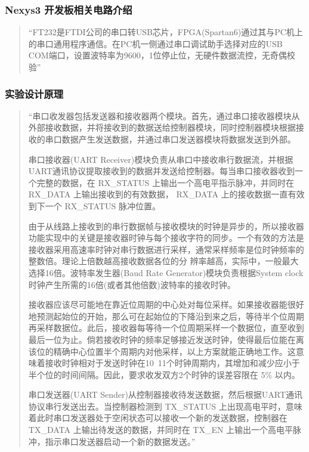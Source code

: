 \documentclass[11pt,a4paper]{article}
\begin{document}
\subsubsection{Nexys3 开发板相关电路介绍}
\begin{quotation}
  “FT232是FTDI公司的串口转USB芯片，FPGA(Spartan6)通过其与PC机上的串口通用程序通信。在PC机一侧通过串口调试助手选择对应的USB COM端口，设置波特率为9600，1位停止位，无硬件数据流控，无奇偶校验”
\end{quotation}

\subsubsection{实验设计原理}
\begin{quotation}
  “串口收发器包括发送器和接收器两个模块。首先，通过串口接收器模块从外部接收数据，并将接收到的数据送给控制器模块，同时控制器模块根据接收的串口数据产生发送数据，并通过串口发送器模块将数据发送到外部。

  串口接收器(UART Receiver)模块负责从串口中接收串行数据流，并根据UART通讯协议提取接收到的数据并发送给控制器。每当串口接收器收到一个完整的数据，在 RX\_STATUS 上输出一个高电平指示脉冲，并同时在 RX\_DATA 上输出接收到的有效数据， RX\_DATA 上的接收数据一直有效到下一个 RX\_STATUS 脉冲位置。

  由于从线路上接收到的串行数据帧与接收模块的时钟是异步的，所以接收器功能实现中的关键是接收器时钟与每个接收字符的同步。一个有效的方法是接收器采用高速率时钟对串行数据进行采样，通常采样频率是位时钟频率的整数倍。理论上倍数越高接收数据各位的分
  辨率越高，实际中，一般最大选择16倍。波特率发生器(Baud Rate Generator)模块负责根据System clock时钟产生所需的16倍(或者其他倍数)波特率的接收时钟。

  接收器应该尽可能地在靠近位周期的中心处对每位采样。如果接收器能很好地预测起始位的开始，那么可在起始位的下降沿到来之后，等待半个位周期再采样数据位。此后，接收器每等待一个位周期采样一个数据位，直至收到最后一位为止。倘若接收时钟的频率足够接近发送时钟，使得最后位能在离该位的精确中心位置半个周期内对他采样，以上方案就能正确地工作。这意味着接收时钟相对于发送时钟在10~11个时钟周期内，其增加和减少应小于半个位的时间间隔。因此，要求收发双方2个时钟的误差容限在 5\% 以内。

  串口发送器(UART Sender)从控制器接收待发送数据，然后根据UART通讯协议串行发送出去。当控制器检测到 TX\_STATUS 上出现高电平时，意味着此时串口发送器处于空闲状态可以接收一个新的发送数据，控制器在 TX\_DATA 上输出待发送的数据，并同时在 TX\_EN 上输出一个高电平脉冲，指示串口发送器启动一个新的数据发送。”
\end{quotation}
\end{document}
